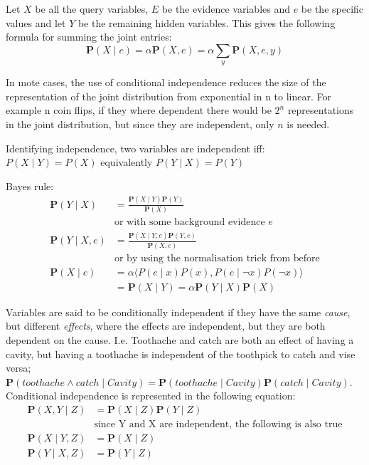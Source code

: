 \documentclass[11pt, letterpaper]{report}
\numberwithin{equation}{section}
\begin{document}
Let $X$ be all the query variables, $E$ be the evidence variables and $e$ be the
specific values and let $Y$ be the remaining hidden variables. This gives the
following formula for summing the joint entries:
\begin{equation}
  \label{eq:inference}
  \boldsymbol{P}(X \mid e) = \alpha \boldsymbol{P}(X,e) = \alpha \sum_y \boldsymbol{P}(X,e, y)
\end{equation}

In mote cases, the use of conditional independence reduces the size of the
representation of the joint distribution from exponential in n to linear. For
example n coin flips, if they where dependent there would be $2^n$
representations in the joint distribution, but since they are independent, only
$n$ is needed.

Identifying independence, two variables are independent iff: \\
$P(X \mid Y) = P(X)$ equivalently $P(Y \mid X) = P(Y)$

Bayes rule:
\setcounter{equation}{12}
\begin{equation}
\begin{split}
  \label{eq:bayesrule}
  \boldsymbol{P}(Y \mid X) &= \frac{\boldsymbol{P}(X \mid
   Y)\boldsymbol{P}(Y)}{\boldsymbol{P}(X)} \\
  & \text{or with some background evidence $e$} \\
  \boldsymbol{P}(Y \mid X,e) &= \frac{\boldsymbol{P}(X \mid Y,e)\boldsymbol{P}(Y,e)}{\boldsymbol{P}(X,e)} \\
  & \text{or by using the normalisation trick from before} \\
  \boldsymbol{P}(X \mid e) &= \alpha \langle P(e \mid x)P(x), P(e \mid \neg x)P(\neg x) \rangle \\
  &= \boldsymbol{P}(X \mid Y) = \alpha \boldsymbol{P}(Y \mid X)\boldsymbol{P}(X)
\end{split}
\end{equation}

Variables are said to be conditionally independent if they have the same \emph{cause},
but different \emph{effects}, where the effects are independent, but they are both
dependent on the cause. I.e. Toothache and catch are both an effect of having a
cavity, but having a toothache is independent of the toothpick to catch and vise versa;
$\boldsymbol{P}(toothache \wedge catch \mid Cavity) =
\boldsymbol{P}(toothache \mid Cavity) \boldsymbol{P}(catch \mid Cavity) $.
Conditional independence is represented in the following equation:
\setcounter{equation}{18}
\begin{equation}
  \begin{split}
    \label{eq:contional}
    \boldsymbol{P}(X, Y \mid Z) &= \boldsymbol{P}(X \mid Z)\boldsymbol{P}(Y \mid Z) \\
    &\text{since Y and X are independent, the following is also true} \\
    \boldsymbol{P}(X \mid Y, Z) &= \boldsymbol{P}(X \mid Z) \\
    \boldsymbol{P}(Y \mid X, Z) &= \boldsymbol{P}(Y \mid Z) \\
  \end{split}
\end{equation}
\end{document}

